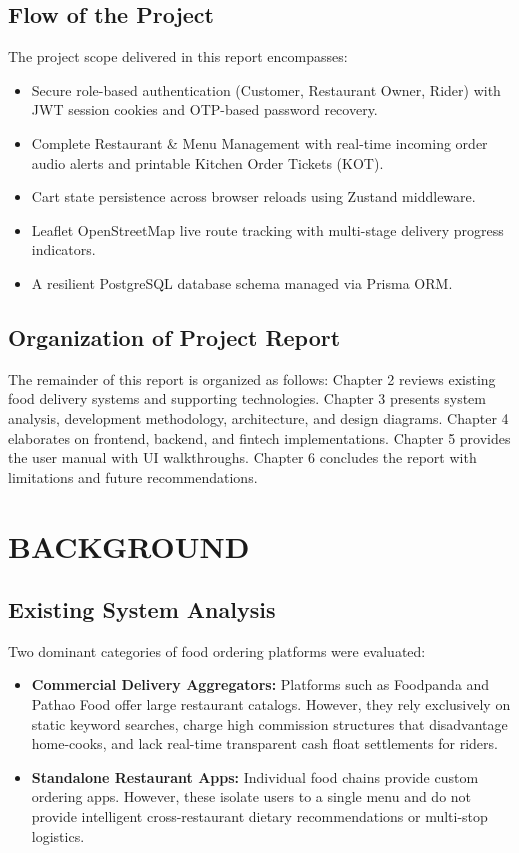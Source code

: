 \documentclass[12pt,a4paper]{report}
\begin{document}
\section{Flow of the Project}
The project scope delivered in this report encompasses:
\begin{itemize}
    \item Secure role-based authentication (Customer, Restaurant Owner, Rider) with JWT session cookies and OTP-based password recovery.
    \item Complete Restaurant \& Menu Management with real-time incoming order audio alerts and printable Kitchen Order Tickets (KOT).
    \item Cart state persistence across browser reloads using Zustand middleware.
    \item Leaflet OpenStreetMap live route tracking with multi-stage delivery progress indicators.
    \item A resilient PostgreSQL database schema managed via Prisma ORM.
\end{itemize}

\section{Organization of Project Report}
The remainder of this report is organized as follows: Chapter 2 reviews existing food delivery systems and supporting technologies. Chapter 3 presents system analysis, development methodology, architecture, and design diagrams. Chapter 4 elaborates on frontend, backend, and fintech implementations. Chapter 5 provides the user manual with UI walkthroughs. Chapter 6 concludes the report with limitations and future recommendations.

\newpage

\chapter{BACKGROUND}

\section{Existing System Analysis}
Two dominant categories of food ordering platforms were evaluated:
\begin{itemize}
    \item \textbf{Commercial Delivery Aggregators:} Platforms such as Foodpanda and Pathao Food offer large restaurant catalogs. However, they rely exclusively on static keyword searches, charge high commission structures that disadvantage home-cooks, and lack real-time transparent cash float settlements for riders.
    \item \textbf{Standalone Restaurant Apps:} Individual food chains provide custom ordering apps. However, these isolate users to a single menu and do not provide intelligent cross-restaurant dietary recommendations or multi-stop logistics.
\end{itemize}
\end{document}
